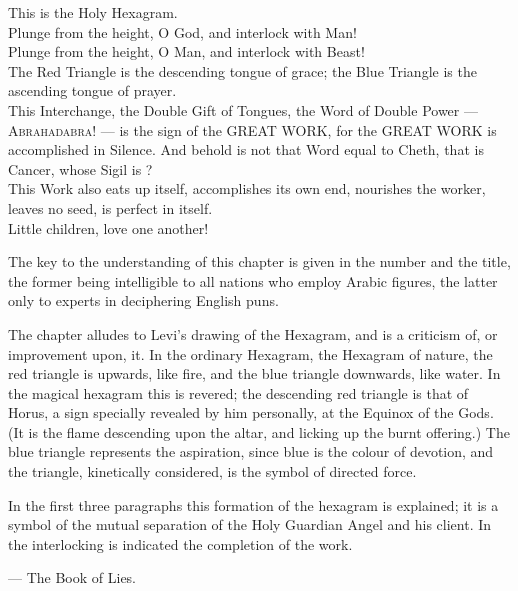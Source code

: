   \begin{Verse}
  This is the Holy Hexagram. \\
  Plunge from the height, O God, and interlock with Man! \\
  Plunge from the height, O Man, and interlock with Beast! \\
  The Red Triangle is the descending tongue of grace; the Blue Triangle is the ascending tongue of prayer. \\
  This Interchange, the Double Gift of Tongues, the Word of Double Power --- \textsc{Abrahadabra!} --- is the sign of the GREAT WORK, for the GREAT WORK is accomplished in Silence. And behold is not that Word equal to Cheth, that is Cancer, whose Sigil is \cancer{}? \\
  This Work also eats up itself, accomplishes its own end, nourishes the worker, leaves no seed, is perfect in itself. \\
  Little children, love one another! \\
  \end{Verse}
  \pagebreak

  \addchap*{}
  \addsec*{}

  The key to the understanding of this chapter is given in the number and the title, the former being intelligible to all nations who employ Arabic figures, the latter only to experts in deciphering English puns.

  The chapter alludes to Levi's drawing of the Hexagram, and is a criticism of, or improvement upon, it. In the ordinary Hexagram, the Hexagram of nature, the red triangle is upwards, like fire, and the blue triangle downwards, like water.  In the magical hexagram this is revered; the descending red triangle is that of Horus, a sign specially revealed by him personally, at the Equinox of the Gods.  (It is the flame descending upon the altar, and licking up the burnt offering.)  The blue triangle represents the aspiration, since blue is the colour of devotion, and the triangle, kinetically considered, is the symbol of directed force.

  In the first three paragraphs this formation of the hexagram is explained; it is a symbol of the mutual separation of the Holy Guardian Angel and his client. In the interlocking is indicated the completion of the work.

  --- The Book of Lies.

  \vspace*{\fill}

